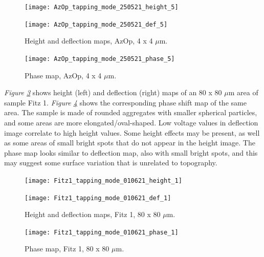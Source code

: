 \begin{figure}[H]
\centering
\begin{minipage}{.45\textwidth}
  \centering
  \texttt{[image: AzOp\_tapping\_mode\_250521\_height\_5]}
\end{minipage}
\begin{minipage}{.45\textwidth}
  \centering
  \texttt{[image: AzOp\_tapping\_mode\_250521\_def\_5]}
\end{minipage}
\caption[Height and deflection maps, AzOp]{Height and deflection maps, AzOp, 4 x 4 $\mu$m.}
\label{fig:afm_azop_height_def_4}
\end{figure}

\begin{figure}[H]
\centering
  \texttt{[image: AzOp\_tapping\_mode\_250521\_phase\_5]}
\caption[Phase map, AzOp]{Phase map, AzOp, 4 x 4 $\mu$m.}
\label{fig:afm_azop_phase_4}
\end{figure}


\textit{Figure \ref{fig:afm_fitz1_height_def_1}} shows height (left) and deflection (right) maps of an 80 x 80 $\mu$m area of sample Fitz 1. \textit{Figure \ref{fig:afm_fitz1_phase_1}} shows the corresponding phase shift map of the same area. The sample is made of rounded aggregates with smaller spherical particles, and some areas are more elongated/oval-shaped. Low voltage values in deflection image correlate to high height values. Some height effects may be present, as well as some areas of small bright spots that do not appear in the height image. The phase map looks similar to deflection map, also with small bright spots, and this may suggest some surface variation that is unrelated to topography.

\begin{figure}[H]
\centering
\begin{minipage}{.45\textwidth}
  \centering
  \texttt{[image: Fitz1\_tapping\_mode\_010621\_height\_1]}
\end{minipage}
\begin{minipage}{.45\textwidth}
  \centering
  \texttt{[image: Fitz1\_tapping\_mode\_010621\_def\_1]}
\end{minipage}
\caption[Height and deflection maps, Fitz 1]{Height and deflection maps, Fitz 1, 80 x 80 $\mu$m.}
\label{fig:afm_fitz1_height_def_1}
\end{figure}

\begin{figure}[H]
\centering
  \texttt{[image: Fitz1\_tapping\_mode\_010621\_phase\_1]}
\caption[Phase map, Fitz 1]{Phase map, Fitz 1, 80 x 80 $\mu$m.}
\label{fig:afm_fitz1_phase_1}
\end{figure}

